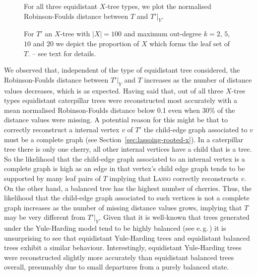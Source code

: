 \begin{figure}
  \centering
  \begin{tikzpicture}
    
  \end{tikzpicture}
  \endpgfgraphicnamed  
  \caption{For all three equidistant $X$-tree types, we plot the normalised
    Robinson-Foulds distance between $T$ and $T'|_Y$.}
  \label{fig:rob-foulds-shapes}
\end{figure}

\begin{figure}
  \centering
  \begin{tikzpicture}
    
  \end{tikzpicture}
  \endpgfgraphicnamed  
  \caption{For $T'$ an $X$-tree with $|X|=100$ and maximum out-degree $k= 2$,
    $5$, $10$ and $20$ we depict the proportion of $X$ which forms the leaf
    set of $T$. -- see text for details.  }
  \label{fig:simulation-nleaves}
\end{figure}

We observed that, independent of the type of equidistant tree considered, the
Robinson-Foulds distance between $T'|_Y$ and $T$ increases as the number of
distance values decreases, which is as expected. Having said that, out of all
three $X$-tree types equidistant caterpillar trees were reconstructed most
accurately with a mean normalised Robinson-Foulds distance below 0.1 even when
$30\%$ of the distance values were missing. A potential reason for this might
be that to correctly reconstruct a internal vertex $v$ of $T'$ the child-edge
graph associated to $v$ must be a complete graph (see
Section~\ref{sec:lassoing-rooted-x}).  In a caterpillar tree there is only one
cherry, all other internal vertices have a child that is a tree.  So the
likelihood that the child-edge graph associated to an internal vertex is a
complete graph is high as an edge in that vertex's child edge graph tends to
be supported by many leaf pairs of $T$ implying that \textsc{Lasso} correctly
reconstructs $v$. On the other hand, a balanced tree has the highest number of
cherries. Thus, the likelihood that the child-edge graph associated to such
vertices is not a complete graph increases as the number of missing distance
values grows, implying that $T$ may be very different from $T'|_Y$. Given that
it is well-known that trees generated under the Yule-Harding model tend to be
highly balanced (see e.\,g.\,\cite[Section 2.5]{semple2003phylogenetics}) it
is unsurprising to see that equidistant Yule-Harding trees and equidistant
balanced trees exhibit a similar behaviour.  Interestingly, equidistant
Yule-Harding trees were reconstructed slightly more accurately than
equidistant balanced trees overall, presumably due to small departures from a
purely balanced state.

